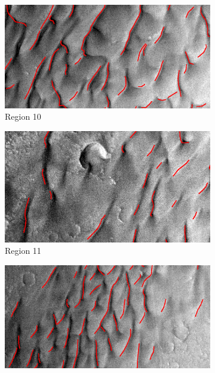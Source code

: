 \begin{figure}[htbp]
	\begin{subfigure}[b]{0.3\textwidth}
		\centering
		\includegraphics[width=\textwidth]{figures/area10_with_gt}
		\caption{  Region 10 }
		\label{fig:area10_image}
	\end{subfigure}
	\begin{subfigure}[b]{0.3\textwidth}
		\centering
		\includegraphics[width=\textwidth]{figures/area11_with_gt}
		\caption{  Region 11 }
		\label{fig:area11_image}
	\end{subfigure}
	\begin{subfigure}[b]{0.3\textwidth}
		\centering
		\includegraphics[width=\textwidth]{figures/area12_with_gt}

\end{subfigure}
\end{figure}
